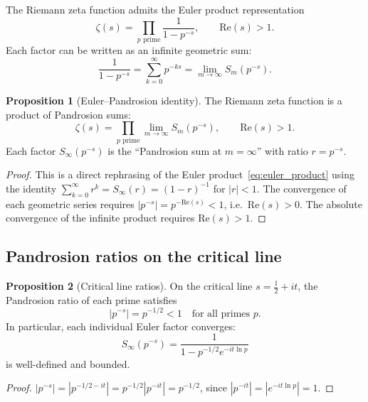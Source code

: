 \documentclass[11pt,a4paper]{article}
\theoremstyle{definition}
\newtheorem{proposition}{Proposition}[section]
\begin{document}
The Riemann zeta function admits the Euler product representation
\begin{equation}
  \label{eq:euler_product}
  \zeta(s) = \prod_{p \text{ prime}} \frac{1}{1 - p^{-s}},
  \qquad \mathrm{Re}(s) > 1.
\end{equation}
Each factor can be written as an infinite geometric sum:
\[
  \frac{1}{1 - p^{-s}} = \sum_{k=0}^{\infty} p^{-ks} = \lim_{m \to \infty} S_m(p^{-s}).
\]

\begin{proposition}[Euler--Pandrosion identity]
\label{prop:euler_pandrosion}
The Riemann zeta function is a product of Pandrosion sums:
\begin{equation}
  \label{eq:euler_pandrosion}
  \zeta(s) = \prod_{p \text{ prime}} \lim_{m \to \infty} S_m(p^{-s}),
  \qquad \mathrm{Re}(s) > 1.
\end{equation}
Each factor $S_\infty(p^{-s})$ is the ``Pandrosion sum at $m = \infty$'' with ratio $r = p^{-s}$.
\end{proposition}

\begin{proof}
This is a direct rephrasing of the Euler product~\eqref{eq:euler_product} using the identity $\sum_{k=0}^{\infty} r^k = S_\infty(r) = (1-r)^{-1}$ for $|r| < 1$.  The convergence of each geometric series requires $|p^{-s}| = p^{-\mathrm{Re}(s)} < 1$, i.e.\ $\mathrm{Re}(s) > 0$.  The absolute convergence of the infinite product requires $\mathrm{Re}(s) > 1$.
\end{proof}

\subsection{Pandrosion ratios on the critical line}

\begin{proposition}[Critical line ratios]
\label{prop:critical_line}
On the critical line $s = \tfrac{1}{2} + it$, the Pandrosion ratio of each prime satisfies
\begin{equation}
  \label{eq:critical_ratio}
  |p^{-s}| = p^{-1/2} < 1 \quad \text{for all primes } p.
\end{equation}
In particular, each individual Euler factor converges:
\[
  S_\infty(p^{-s}) = \frac{1}{1 - p^{-1/2} e^{-it \ln p}}
\]
is well-defined and bounded.
\end{proposition}

\begin{proof}
$|p^{-s}| = |p^{-1/2 - it}| = p^{-1/2} |p^{-it}| = p^{-1/2}$, since $|p^{-it}| = |e^{-it \ln p}| = 1$.
\end{proof}
\end{document}
